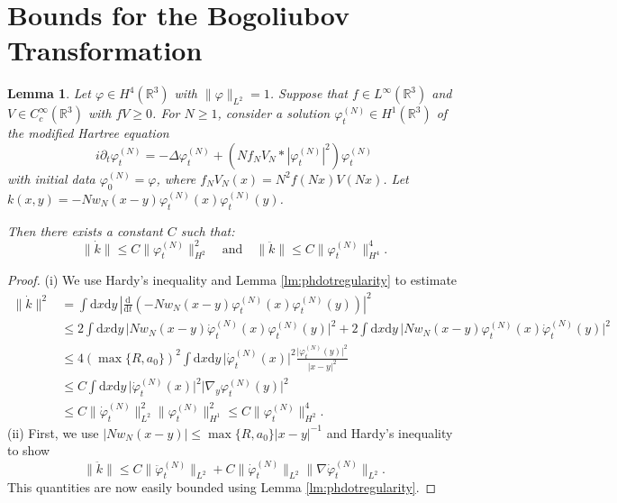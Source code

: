 \documentclass[11pt,a4paper,DIV11]{scrartcl}	%
\newtheorem{lem}[thm]{Lemma}
\newcommand{\R}{\mathds{R}}
\newcommand{\di}{\textrm{d}}		%
\newcommand{\norm}[1]{\lVert#1\rVert}	%
\newcommand{\ph}{\varphi_t^{(N)}}	%
\newcommand{\phdot}{\dot{\varphi}_t^{(N)}}	%
\newcommand{\phddot}{\ddot{\varphi}_t^{(N)}}	%
\newcommand{\bd}{\begin{displaymath}}			%
\newcommand{\ed}{\end{displaymath}}
\begin{document}
\section{Bounds for the Bogoliubov Transformation}
\label{s:bogbounds}
%
\begin{lem} \label{lm:kbounds}
Let $\varphi \in H^4(\R^3)$ with $\| \varphi \|_{L^2} = 1$. Suppose that
  $f \in L^\infty(\R^3)$ and $V \in C_c^\infty(\R^3)$ with $fV \ge 0$. For $N \ge
  1$, consider a solution $\varphi_t^{(N)} \in H^1(\R^3)$ of the modified
  Hartree equation
  \[
    i \partial_t \varphi_t^{(N)} = - \Delta \varphi_t^{(N)} + (N f_N V_N *
    |\varphi_t^{(N)}|^2) \varphi_t^{(N)}
  \]
  with initial data $\varphi^{(N)}_0 = \varphi$, where $f_N V_N(x) = N^2
  f(Nx)V(Nx)$. Let $k(x,y) = -N w_N(x-y) \ph(x) \ph(y)$.

Then there exists a constant $C$ such that:
\bd
\norm{\dot k} \leq C \norm{\ph}_{H^2}^2
 \quad \mbox{and} \quad
\norm{\ddot k} \leq C \norm{\ph}_{H^4}^4.
\ed
\end{lem}
\begin{proof} (i) We use Hardy's inequality and Lemma \ref{lm:phdotregularity} to estimate
\begin{align*}
\norm{\dot k}^2 & = \int \di x\di y\, \left\lvert \frac{\di}{\di t} \left( -N w_N(x-y) \ph(x)\ph(y) \right) \right\rvert^2 \\
& \leq 2 \int \di x\di y\, \lvert N w_N(x-y) \phdot(x) \ph(y) \rvert^2 + 2 \int \di x \di y\, \lvert N w_N(x-y) \ph(x) \phdot(y) \rvert^2 \\
& \leq 4 \left( \max\{R,a_0\} \right)^2 \int \di x\di y\, \lvert \phdot(x)\rvert^2 \frac{\lvert\ph(y)\rvert^2}{\lvert x-y\rvert^2} \\
& \leq C \int \di x\di y\, \lvert \phdot(x)\rvert^2 \lvert \nabla_y \ph(y)\rvert^2 \\
& \leq C \norm{\phdot}_{L^2}^2 \norm{\ph}_{H^1}^2 \leq C \norm{\ph}_{H^2}^4.
\end{align*}
(ii) First, we use $\lvert N w_N(x-y) \rvert \leq \max \{R,a_0\} \lvert x-y\rvert^{-1}$ and Hardy's inequality to show
\bd
\norm{\ddot k} \leq C \norm{\phddot}_{L^2} + C \norm{\phdot}_{L^2} \norm{\nabla \phdot}_{L^2}.
\ed
This quantities are now easily bounded using Lemma \ref{lm:phdotregularity}.
\end{proof}
\end{document}
